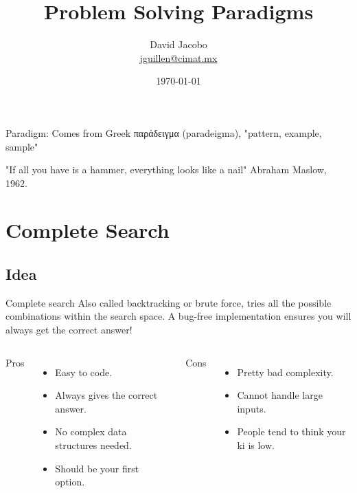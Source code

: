 \documentclass[article]{beamer}
\title{Problem Solving Paradigms}
\author{David Jacobo \\ \href{mailto:jguillen@cimat.mx}{jguillen@cimat.mx}}
\date{\scriptsize{\today}}
\begin{document}
\maketitle

\begin{frame}
\begin{block}{Paradigm:}
	Comes from Greek παράδειγμα (paradeigma), "pattern, example, sample"
\end{block}

\vspace{12mm}

\begin{flushright} {\footnotesize
	"If all you have is a hammer, everything looks like a nail" \newline Abraham Maslow, 1962.
} \end{flushright} 
\end{frame}

\section{Complete Search}
\subsection{Idea}

\begin{frame}[fragile]
\begin{block}{Complete search}
Also called backtracking or brute force, tries all the possible combinations within the search space. A bug-free implementation ensures you will always get the correct answer! 
\end{block}
\end{frame}

\begin{frame}[fragile]
\begin{columns}
Pros
\begin{itemize}
	\item Easy to code.
	\item Always gives the correct answer.
	\item No complex data structures needed.
	\item Should be your first option.
\end{itemize}

Cons
\begin{itemize}
	\item Pretty bad complexity.
	\item Cannot handle large inputs.
	\item People tend to think your ki is low.
\end{itemize}
\end{columns}
\end{frame}
\end{document}
